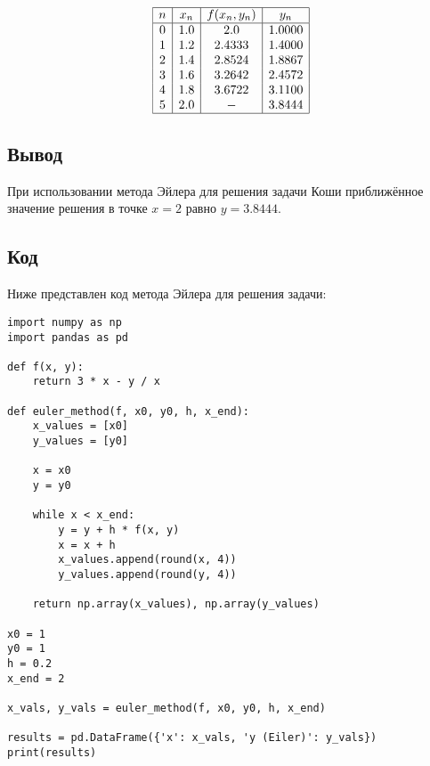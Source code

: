 \documentclass[a4paper,12pt]{article}
\begin{document}
\[
\begin{array}{|c|c|c|c|}
\hline
n & x_n & f(x_n, y_n) & y_n \\ \hline
0 & 1.0 & 2.0 & 1.0000 \\
1 & 1.2 & 2.4333 & 1.4000 \\
2 & 1.4 & 2.8524 & 1.8867 \\
3 & 1.6 & 3.2642 & 2.4572 \\
4 & 1.8 & 3.6722 & 3.1100 \\
5 & 2.0 & - & 3.8444 \\ \hline
\end{array}
\]

\subsection*{Вывод}
При использовании метода Эйлера для решения задачи Коши приближённое значение решения в точке \( x = 2 \) равно \( y = 3.8444 \).



\subsection*{Код}
\par
Ниже представлен код метода Эйлера для решения задачи:

\begin{lstlisting}
import numpy as np
import pandas as pd

def f(x, y):
    return 3 * x - y / x

def euler_method(f, x0, y0, h, x_end):
    x_values = [x0]
    y_values = [y0]

    x = x0
    y = y0

    while x < x_end:
        y = y + h * f(x, y)
        x = x + h
        x_values.append(round(x, 4))
        y_values.append(round(y, 4))

    return np.array(x_values), np.array(y_values)

x0 = 1
y0 = 1
h = 0.2
x_end = 2

x_vals, y_vals = euler_method(f, x0, y0, h, x_end)

results = pd.DataFrame({'x': x_vals, 'y (Eiler)': y_vals})
print(results)
\end{lstlisting}
\end{document}
